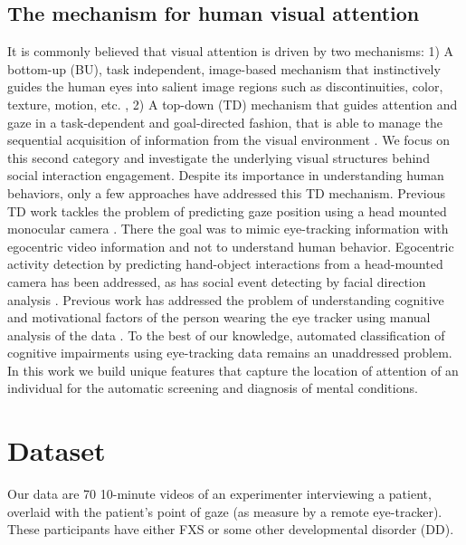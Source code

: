 \documentclass[10pt,twocolumn,letterpaper]{article}
\begin{document}
\subsection{The mechanism for human visual attention} It is commonly believed that visual attention is driven by two mechanisms: 1) A bottom-up (BU), task independent, image-based mechanism that instinctively guides the human eyes into salient image regions such as discontinuities, color, texture, motion, etc. \cite{AmodelofsaliencybasedvisualattentionforrapidsceneanalysisItti:tq}, 2) A top-down (TD)  mechanism that guides attention and gaze in a task-dependent and goal-directed fashion, that is able to manage the sequential acquisition of information from the visual environment \cite{HANDEYE, Borji:2012dq}. We focus on this second category and investigate the underlying visual structures behind social interaction engagement. Despite its importance in understanding human behaviors, only a few approaches have addressed this TD mechanism. Previous TD work tackles the problem of predicting gaze position using a head mounted monocular camera \cite{Fathi:2012vk}. There the goal was to mimic eye-tracking information with egocentric video information and not to understand human behavior. Egocentric activity detection by predicting hand-object interactions from a head-mounted camera \cite{Fathi:2013tc} has been addressed, as has social event detecting by facial direction analysis \cite{FromEgotoNosVisionDetectingSocialRelationshipsinFirstPersonViewsAlletto:wi}. Previous work has addressed the problem of understanding cognitive and motivational factors of the person wearing the eye tracker using manual analysis of the data \cite{linda}. To the best of our knowledge, automated classification of cognitive impairments using eye-tracking data remains an unaddressed problem.  In this work we build unique features that capture the location of attention of an individual for the automatic screening and diagnosis of mental conditions.  
 
\section{Dataset}

Our data are 70 10-minute videos of an experimenter interviewing a patient, overlaid with the patient's point of gaze (as measure by a remote eye-tracker). These participants have either FXS or some other developmental disorder (DD). 
\end{document}
